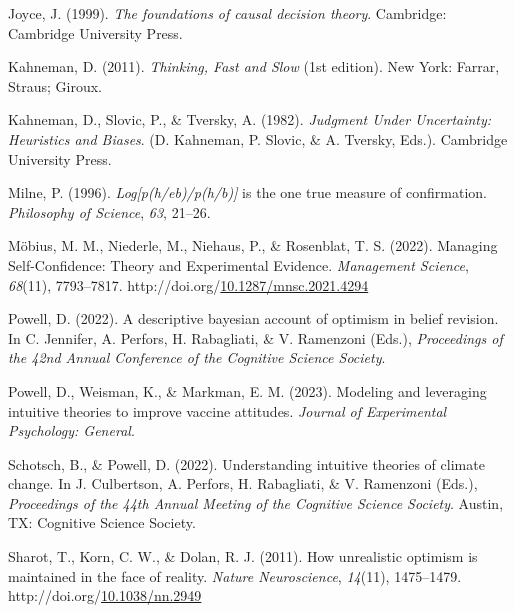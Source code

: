 \documentclass[10pt, letterpaper]{article}
\newenvironment{CSLReferences}%
  {}%
  {\par}
\begin{document}
\begin{CSLReferences}
\leavevmode{}%
Joyce, J. (1999). \emph{The foundations of causal decision theory}.
Cambridge: Cambridge University Press.

\leavevmode{}%
Kahneman, D. (2011). \emph{Thinking, {Fast} and {Slow}} (1st edition).
New York: Farrar, Straus; Giroux.

\leavevmode{}%
Kahneman, D., Slovic, P., \& Tversky, A. (1982). \emph{Judgment {Under}
{Uncertainty}: {Heuristics} and {Biases}}. (D. Kahneman, P. Slovic, \&
A. Tversky, Eds.). Cambridge University Press.

\leavevmode{}%
Milne, P. (1996). \emph{Log{[}p(h/eb)/p(h/b){]}} is the one true measure
of confirmation. \emph{Philosophy of Science}, \emph{63}, 21--26.

\leavevmode{}%
Möbius, M. M., Niederle, M., Niehaus, P., \& Rosenblat, T. S. (2022).
Managing {Self}-{Confidence}: {Theory} and {Experimental} {Evidence}.
\emph{Management Science}, \emph{68}(11), 7793--7817.
http://doi.org/\href{https://doi.org/10.1287/mnsc.2021.4294}{10.1287/mnsc.2021.4294}

\leavevmode{}%
Powell, D. (2022). A descriptive bayesian account of optimism in belief
revision. In C. Jennifer, A. Perfors, H. Rabagliati, \& V. Ramenzoni
(Eds.), \emph{Proceedings of the 42nd {Annual} {Conference} of the
{Cognitive} {Science} {Society}}.

\leavevmode{}%
Powell, D., Weisman, K., \& Markman, E. M. (2023). Modeling and
leveraging intuitive theories to improve vaccine attitudes.
\emph{Journal of Experimental Psychology: General}.

\leavevmode{}%
Schotsch, B., \& Powell, D. (2022). Understanding intuitive theories of
climate change. In J. Culbertson, A. Perfors, H. Rabagliati, \& V.
Ramenzoni (Eds.), \emph{Proceedings of the 44th {Annual} {Meeting} of
the {Cognitive} {Science} {Society}}. Austin, TX: Cognitive Science
Society.

\leavevmode{}%
Sharot, T., Korn, C. W., \& Dolan, R. J. (2011). How unrealistic
optimism is maintained in the face of reality. \emph{Nature
Neuroscience}, \emph{14}(11), 1475--1479.
http://doi.org/\href{https://doi.org/10.1038/nn.2949}{10.1038/nn.2949}


\end{CSLReferences}
\end{document}
